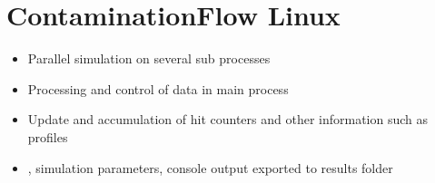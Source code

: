 
\chapter{ContaminationFlow Linux}\label{chapter:Linux}
\begin{itemize}[noitemsep,topsep=0pt, partopsep=0pt]
\item Parallel simulation on several sub processes
\item Processing and control of data in main process
\item Update and accumulation of hit counters and other information such as profiles
\item {}, simulation parameters, console output exported to results folder
\end{itemize}
\smallskip
